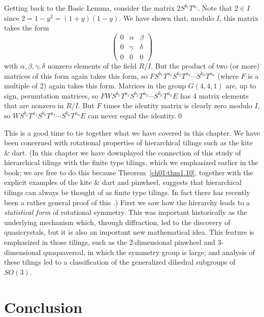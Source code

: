 \documentclass[reqno]{stml-l}
\theoremstyle{plain}
\theoremstyle{definition}
\numberwithin{equation}{chapter}
\begin{document}
Getting back to the Basic Lemma, consider the matrix $2S^{b_{i}}T^{a_{i}}$. Note that $2\in I$ since $2=1-y^{2}=(1+y)(1-y)$. We have shown that, modulo $I$, this matrix takes the form
\begin{equation}\label{ch04:eqn4.34}
\left(\begin{array}{lll}
0 & \alpha & \beta\\
0 & \gamma & \delta\\
0 & 0 & 0
\end{array}\right)
\end{equation}
with $\alpha,\beta,\gamma,\delta$ nonzero elements of the
field $R/I$. But the product of two (or more) matrices of
this form again takes this form, so
$FS^{b_{1}}T^{a_{1}}S^{b_{2}}T^{a_{2}}\cdots
S^{b_{n}}T^{a_{n}}$ (where $F$ is a multiple of 2) again
takes this form. Matrices in the group $G(4,4,1)$ are, up
to sign, permutation matrices, so
$FWS^{b_{1}}T^{a_{1}}S^{b_{2}}T^{a_{2}}\cdots
S^{b_{n}}T^{a_{n}}E$ has 4 matrix elements that are nonzero
in $R/I$. But $F$ times the identity matrix is clearly zero
modulo $I$, so $WS^{b_{1}}T^{a_{1}}S^{b_{2}}T^{a_{2}}\cdots
S^{b_{n}}T^{a_{n}}E$ can never equal the identity.\qed

This is a good time to tie together what we have covered in
this chapter. We have been concerned with rotational
properties of hierarchical tilings such as the kite \&
dart. (In this chapter we have downplayed the connection of
this study of hierarchical tilings with the finite type
tilings, which we emphasized earlier in the book; we are
free to do this because Theorem~\ref{ch01:thm1.10},
together with the explicit examples of the kite \& dart and
pinwheel, suggests that hierarchical tilings can always be
thought of as finite type tilings. In fact there has
recently been a rather general proof of this
\cite{bib:Goo}.) First we saw how the hierarchy leads to a
\emph{statistical form} of rotational symmetry. This was
important historically as the underlying mechanism which,
through diffraction, led to the discovery of quasicrystals,
but it is also an important new mathematical idea. This
feature is emphasized in those tilings, such as the
2-dimensional pinwheel and 3-dimensional quaquaversal, in
which the symmetry group is large; and analysis of these
tilings led to a classification of the generalized dihedral
subgroups of $SO(3)$.


\chapter{Conclusion}\label{ch05:chap05}
\end{document}
